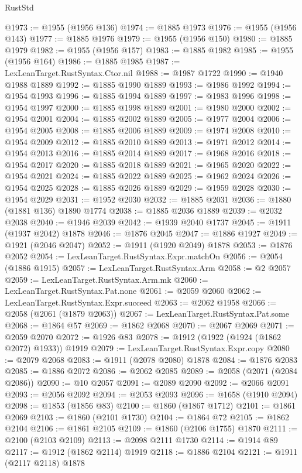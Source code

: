 \begin{lexlean}{RustStd}
\begin{coremodule}
@1973 := @1955 (@1956 @136)
@1974 := @1885 @1973
@1976 := @1955 (@1956 @143)
@1977 := @1885 @1976
@1979 := @1955 (@1956 @150)
@1980 := @1885 @1979
@1982 := @1955 (@1956 @157)
@1983 := @1885 @1982
@1985 := @1955 (@1956 @164)
@1986 := @1885 @1985
@1987 := LexLeanTarget.RustSyntax.Ctor.nil
@1988 := @1987 @1722
@1990 := @1940 @1988 @1889
@1992 := @1885 @1990 @1889
@1993 := @1986 @1992
@1994 := @1954 @1993
@1996 := @1885 @1994 @1889
@1997 := @1983 @1996
@1998 := @1954 @1997
@2000 := @1885 @1998 @1889
@2001 := @1980 @2000
@2002 := @1954 @2001
@2004 := @1885 @2002 @1889
@2005 := @1977 @2004
@2006 := @1954 @2005
@2008 := @1885 @2006 @1889
@2009 := @1974 @2008
@2010 := @1954 @2009
@2012 := @1885 @2010 @1889
@2013 := @1971 @2012
@2014 := @1954 @2013
@2016 := @1885 @2014 @1889
@2017 := @1968 @2016
@2018 := @1954 @2017
@2020 := @1885 @2018 @1889
@2021 := @1965 @2020
@2022 := @1954 @2021
@2024 := @1885 @2022 @1889
@2025 := @1962 @2024
@2026 := @1954 @2025
@2028 := @1885 @2026 @1889
@2029 := @1959 @2028
@2030 := @1954 @2029
@2031 := @1952 @2030
@2032 := @1885 @2031
@2036 := @1880 (@1881 @136) @1890 @1774
@2038 := @1885 @2036 @1889
@2039 := @2032 @2038
@2040 := @1946 @2039
@2042 := @1939 @2040 @1737
@2045 := @1911 (@1937 @2042) @1878
@2046 := @1876 @2045
@2047 := @1886 @1927
@2049 := @1921 (@2046 @2047)
@2052 := @1911 (@1920 @2049) @1878
@2053 := @1876 @2052
@2054 := LexLeanTarget.RustSyntax.Expr.matchOn
@2056 := @2054 (@1886 @1915)
@2057 := LexLeanTarget.RustSyntax.Arm
@2058 := @2 @2057
@2059 := LexLeanTarget.RustSyntax.Arm.mk
@2060 := LexLeanTarget.RustSyntax.Pat.none
@2061 := @2059 @2060
@2062 := LexLeanTarget.RustSyntax.Expr.succeed
@2063 := @2062 @1958
@2066 := @2058 (@2061 (@1879 @2063))
@2067 := LexLeanTarget.RustSyntax.Pat.some
@2068 := @1864 @57
@2069 := @1862 @2068
@2070 := @2067 @2069
@2071 := @2059 @2070
@2072 := @1926 @83
@2078 := @1912 (@1922 (@1924 (@1862 @2072) @1933)) @1919
@2079 := LexLeanTarget.RustSyntax.Expr.copy
@2080 := @2079 @2068
@2083 := @1911 (@2078 @2080) @1878
@2084 := @1876 @2083
@2085 := @1886 @2072
@2086 := @2062 @2085
@2089 := @2058 (@2071 (@2084 @2086))
@2090 := @10 @2057
@2091 := @2089 @2090
@2092 := @2066 @2091
@2093 := @2056 @2092
@2094 := @2053 @2093
@2096 := @1658 (@1910 @2094)
@2098 := @1853 (@1856 @83)
@2100 := @1860 (@1867 @1712)
@2101 := @1861 @2069
@2103 := @1860 (@2101 @1730)
@2104 := @1864 @72
@2105 := @1862 @2104
@2106 := @1861 @2105
@2109 := @1860 (@2106 @1755) @1870
@2111 := @2100 (@2103 @2109)
@2113 := @2098 @2111 @1730
@2114 := @1914 @89
@2117 := @1912 (@1862 @2114) @1919
@2118 := @1886 @2104
@2121 := @1911 (@2117 @2118) @1878

\end{coremodule}
\end{lexlean}
